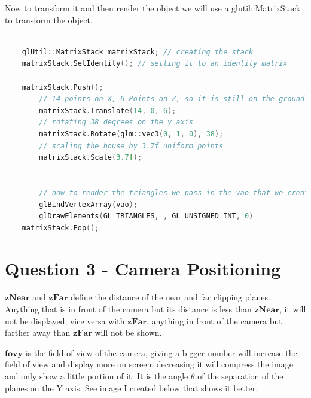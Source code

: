 \documentclass[10pt]{report}
\begin{document}

Now to transform it and then render the object we will use a glutil::MatrixStack to transform the object.

\begin{lstlisting}[language=c]

    glUtil::MatrixStack matrixStack; // creating the stack
    matrixStack.SetIdentity(); // setting it to an identity matrix

    matrixStack.Push();
        // 14 points on X, 6 Points on Z, so it is still on the ground plane while being on a new positions
        matrixStack.Translate(14, 0, 6);
        // rotating 38 degrees on the y axis
        matrixStack.Rotate(glm::vec3(0, 1, 0), 38);
        // scaling the house by 3.7f uniform points
        matrixStack.Scale(3.7f);


        // now to render the triangles we pass in the vao that we created and then draw it on screen.
        glBindVertexArray(vao);
        glDrawElements(GL_TRIANGLES, , GL_UNSIGNED_INT, 0)
    matrixStack.Pop();

\end{lstlisting}

\chapter{Question 3 - Camera Positioning}

\(\textbf{zNear}\) and \(\textbf{zFar}\) define the distance of the near and far clipping planes. Anything that is in front of the camera but its distance is less than \(\textbf{zNear}\), it will not be displayed; vice versa with \(\textbf{zFar}\), anything in front of the camera but farther away than \(\textbf{zFar}\) will not be shown.

\(\textbf{fovy}\) is the field of view of the camera, giving a bigger number will increase the field of view and display more on screen, decreasing it will compress the image and only show a little portion of it. It is the angle $\theta$ of the separation of the planes on the Y axis. See image I created below that shows it better.
\end{document}
